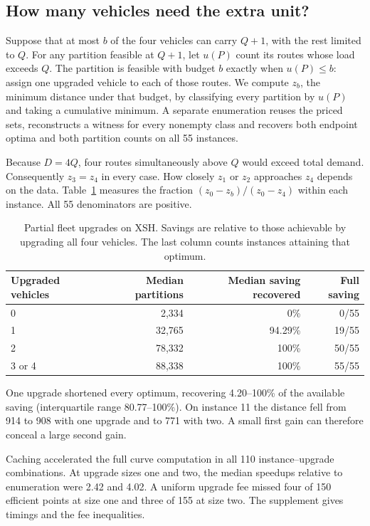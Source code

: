 \documentclass[runningheads]{llncs}
\begin{document}
\subsection{How many vehicles need the extra unit?}
Suppose that at most $b$ of the four vehicles can carry $Q+1$, with the rest limited to $Q$. For any partition feasible at $Q+1$, let $u(P)$ count its routes whose load exceeds $Q$. The partition is feasible with budget $b$ exactly when $u(P)\leq b$: assign one upgraded vehicle to each of those routes. We compute $z_b$, the minimum distance under that budget, by classifying every partition by $u(P)$ and taking a cumulative minimum. A separate enumeration reuses the priced sets, reconstructs a witness for every nonempty class and recovers both endpoint optima and both partition counts on all 55 instances.

Because $D=4Q$, four routes simultaneously above $Q$ would exceed total demand. Consequently $z_3=z_4$ in every case. How closely $z_1$ or $z_2$ approaches $z_4$ depends on the data. Table~\ref{tab:upgrades} measures the fraction $(z_0-z_b)/(z_0-z_4)$ within each instance. All 55 denominators are positive.

\begin{table}[tb]\centering
\caption{Partial fleet upgrades on XSH. Savings are relative to those achievable by upgrading all four vehicles. The last column counts instances attaining that optimum.}\label{tab:upgrades}
\begin{tabular}{lrrr}\toprule
Upgraded vehicles & Median partitions & Median saving recovered & Full saving\\\midrule
0 & 2,334 & 0\% & 0/55\\
1 & 32,765 & 94.29\% & 19/55\\
2 & 78,332 & 100\% & 50/55\\
3 or 4 & 88,338 & 100\% & 55/55\\\bottomrule
\end{tabular}
\end{table}

One upgrade shortened every optimum, recovering 4.20--100\% of the available saving (interquartile range 80.77--100\%). On instance 11 the distance fell from 914 to 908 with one upgrade and to 771 with two. A small first gain can therefore conceal a large second gain.

Caching accelerated the full curve computation in all 110 instance--upgrade combinations. At upgrade sizes one and two, the median speedups relative to enumeration were 2.42 and 4.02. A uniform upgrade fee missed four of 150 efficient points at size one and three of 155 at size two. The supplement gives timings and the fee inequalities.
\end{document}
